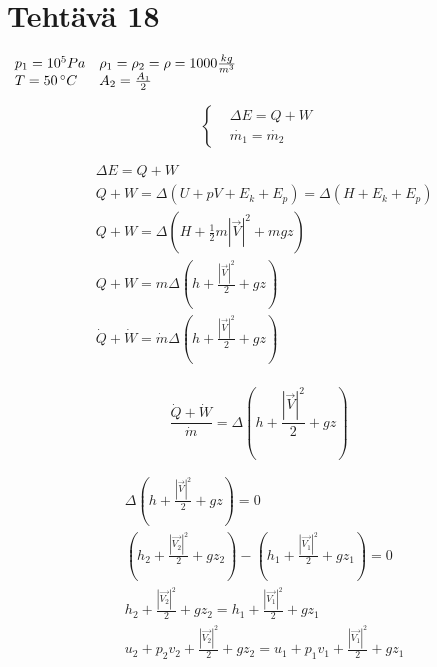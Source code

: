 \documentclass[12pt,a4paper,finnish]{article}
\begin{document}
\section{Tehtävä 18}

\begin{math}
 \begin{array}{l l l}
  p_1 = 10^5 Pa & \rho_1 = \rho_2 = \rho = 1000\frac{kg}{m^3}\\
  T = 50 \,^{\circ}C & A_2 = \frac{A_1}{2}
 \end{array}
\end{math}

\begin{equation}
  \left\{
  \begin{aligned}
  &\Delta E = Q + W\\
    &\dot{m_1} = \dot{m_2}
    \end{aligned}\right.
\end{equation}

\begin{align}
  &\Delta E = Q + W\\
  &Q + W = \Delta \left(U + pV + E_k + E_p\right) = \Delta \left(H + E_k + E_p\right)\\
  &Q + W = \Delta \left(H + \frac{1}{2}m|\vec{V}|^2 + mgz\right)\\
  &Q + W = m\Delta \left(h + \frac{|\vec{V}|^2}{2} + gz\right)\\
  &\dot{Q} + \dot{W} = \dot{m}\Delta \left(h + \frac{|\vec{V}|^2}{2} + gz\right)\\
\end{align}

\begin{framed}
\begin{equation}
  \frac{\dot{Q} + \dot{W}}{\dot{m}} = \Delta \left(h + \frac{|\vec{V}|^2}{2} + gz\right)
\end{equation}
\end{framed}

\begin{align}
  &\Delta \left(h + \frac{|\vec{V}|^2}{2} + gz\right) = 0\\
   &\left(h_2 + \frac{|\vec{V_2}|^2}{2} + gz_2\right) - \left(h_1 + \frac{|\vec{V_1}|^2}{2} + gz_1\right) = 0\\
   &h_2 + \frac{|\vec{V_2}|^2}{2} + gz_2 = h_1 + \frac{|\vec{V_1}|^2}{2} + gz_1\\
   &u_2 + p_2v_2 + \frac{|\vec{V_2}|^2}{2} + gz_2 = u_1 + p_1v_1 + \frac{|\vec{V_1}|^2}{2} + gz_1
\end{align}
\end{document}
